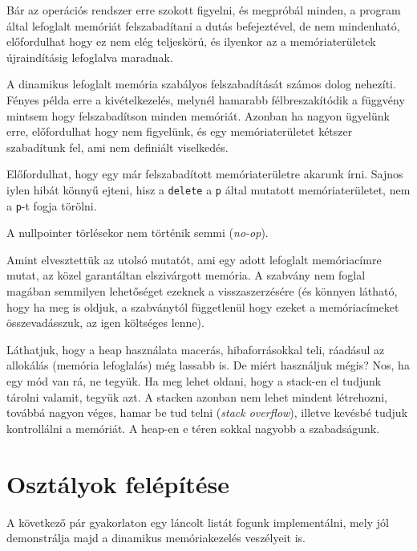 \documentclass[a4paper,11.5pt]{article}
\begin{document}
	Bár az operációs rendszer erre szokott figyelni, és megpróbál minden, a program által lefoglalt memóriát felszabadítani a dutás befejeztével, de nem mindenható, előfordulhat hogy ez nem elég teljeskörú, és ilyenkor az a memóriaterületek újraindításig lefoglalva maradnak.
	\medskip
	
	A dinamikus lefoglalt memória szabályos felszabadítását számos dolog nehezíti. Fényes példa erre a kivételkezelés, melynél hamarabb félbreszakítódik a függvény mintsem hogy felszabadítson minden memóriát. Azonban ha nagyon ügyelünk erre, előfordulhat hogy nem figyelünk, és egy memóriaterületet kétszer szabadítunk fel, ami nem definiált viselkedés.
	\medskip
	
	Előfordulhat, hogy egy már felszabadított memóriaterületre akarunk írni. Sajnos iylen hibát könnyű ejteni, hisz a \texttt{delete} a \texttt{p} által mutatott memóriaterületet, nem a \texttt{p}-t fogja törölni.
	\begin{note}
		A nullpointer törlésekor nem történik semmi (\textit{no-op}).
	\end{note}
	\begin{note}
		Amint elvesztettük az utolsó mutatót, ami egy adott lefoglalt memóriacímre mutat, az közel garantáltan elszivárgott memória. A szabvány nem foglal magában semmilyen lehetőséget ezeknek a visszaszerzésére (és könnyen látható, hogy ha meg is oldjuk, a szabványtól függetlenül hogy ezeket a memóriacímeket összevadásszuk, az igen költséges lenne).
	\end{note}
	Láthatjuk, hogy a heap használata macerás, hibaforrásokkal teli, ráadásul az allokálás (memória lefoglalás) még lassabb is. De miért használjuk mégis? Nos, ha egy mód van rá, ne tegyük. Ha meg lehet oldani, hogy a stack-en el tudjunk tárolni valamit, tegyük azt. A stacken azonban nem lehet mindent létrehozni, továbbá nagyon véges, hamar be tud telni (\textit{stack overflow}), illetve kevésbé tudjuk kontrollálni a memóriát. A heap-en e téren sokkal nagyobb a szabadságunk.
	\section{Osztályok felépítése}
	A következő pár gyakorlaton egy láncolt listát fogunk implementálni, mely jól demonstrálja majd a dinamikus memóriakezelés veszélyeit is.
	
\end{document}
